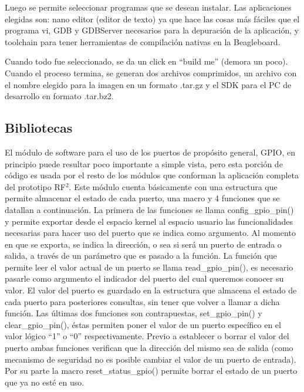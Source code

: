 \bigskip
Luego se permite seleccionar programas que se desean instalar.
Las aplicaciones elegidas son: nano editor (editor de texto) ya que hace las cosas más fáciles que el programa vi, GDB y GDBServer necesarios para la depuración de la aplicación, y toolchain para tener herramientas de compilación nativas en la Beagleboard.

\bigskip
Cuando todo fue seleccionado, se da un click en “build me” (demora un poco).
Cuando el proceso termina, se generan dos archivos comprimidos, un archivo con el nombre elegido para la imagen en un formato .tar.gz y el SDK para el PC de desarrollo en formato .tar.bz2. 

\subsection{Bibliotecas}


El módulo de software para el uso de los puertos de propósito general, GPIO, en principio puede resultar poco importante a simple vista, pero esta porción de código es usada por el resto de los módulos que conforman la aplicación completa del prototipo RF$^{2}$. 
Este módulo cuenta básicamente con una estructura que permite almacenar el estado de cada puerto, una macro y 4 funciones que se datallan a continuación.
La primera de las funciones se llama config\_gpio\_pin() y permite exportar desde el espacio kernel al espacio usuario las funcionalidades necesarias para hacer uso del puerto que se indica como argumento. Al momento en que se exporta, se indica la dirección, o sea si será un puerto de entrada o salida, a través de un parámetro que es pasado a la función.
La función que permite leer el valor actual de un puerto se llama read\_gpio\_pin(), es necesario pasarle como argumento el indicador del puerto del cual queremos conocer su valor. El valor del puerto es guardado en la estructura que almacena el estado de cada puerto para posteriores consultas, sin tener que volver a llamar a dicha función.
Las últimas dos funciones son contrapuestas, set\_gpio\_pin() y clear\_gpio\_pin(), éstas permiten poner el valor de un puerto específico en el valor lógico “1” o “0” respectivamente. Previo a establecer o borrar el valor del puerto ambas funciones verifican que la dirección del mismo sea de salida (como mecanismo de seguridad no es posible cambiar el valor de un puerto de entrada).
Por su parte la macro reset\_status\_gpio() permite borrar el estado de un puerto que ya no esté en uso.

